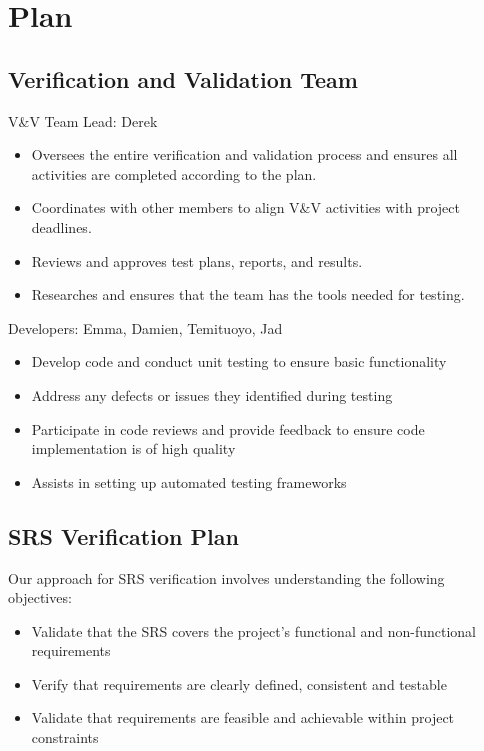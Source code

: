 \documentclass[12pt, titlepage]{article}
\begin{document}
\section{Plan}

\subsection{Verification and Validation Team}

V\&V Team Lead: Derek
\begin{itemize}
    \item Oversees the entire verification and validation process and ensures all activities are completed according to the plan.
    \item Coordinates with other members to align V\&V activities with project deadlines.
    \item Reviews and approves test plans, reports, and results.
    \item Researches and ensures that the team has the tools needed for testing.
\end{itemize}

\noindent Developers: Emma, Damien, Temituoyo, Jad
\begin{itemize}
    \item Develop code and conduct unit testing to ensure basic functionality
    \item Address any defects or issues they identified during testing
    \item Participate in code reviews and provide feedback to ensure code implementation is of high quality
    \item Assists in setting up automated testing frameworks
\end{itemize}

\subsection{SRS Verification Plan}

\noindent Our approach for SRS verification involves understanding the following objectives:

\begin{itemize}
    \item Validate that the SRS covers the project’s functional and non-functional requirements
    \item Verify that requirements are clearly defined, consistent and testable
    \item Validate that requirements are feasible and achievable within project constraints
\end{itemize}
\end{document}
